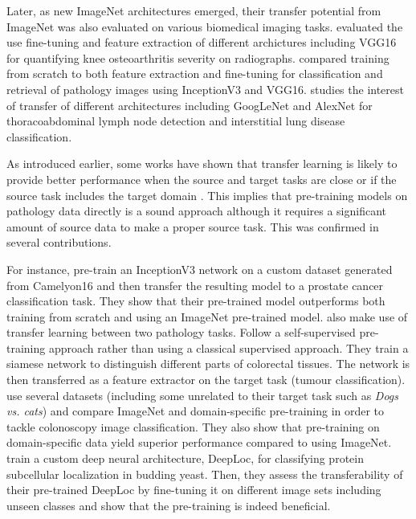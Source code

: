 Later, as new ImageNet architectures emerged, their transfer potential from ImageNet was also evaluated on various biomedical imaging tasks. \parencite{antony2016quantifying} evaluated the use fine-tuning and feature extraction of different archictures including VGG16 for quantifying knee osteoarthritis severity on radiographs. \parencite{kieffer2017convolutional} compared training from scratch to both feature extraction and fine-tuning for classification and retrieval of pathology images using InceptionV3 and VGG16. \parencite{shin2016deep} studies the interest of transfer of different architectures including GoogLeNet and AlexNet for thoracoabdominal lymph node detection and interstitial lung disease classification. 

As introduced earlier, some works have shown that transfer learning is likely to provide better performance when the source and target tasks are close \parencite{yosinski2014transferable} or if the source task includes the target domain \parencite{mensink2021factors}. This implies that pre-training models on pathology data directly is a sound approach although it requires a significant amount of source data to make a proper source task. This was confirmed in several contributions.

For instance, \parencite{khan2019improving} pre-train an InceptionV3 network on a custom dataset generated from Camelyon16 and then transfer the resulting model to a prostate cancer classification task. They show that their pre-trained model outperforms both training from scratch and using an ImageNet pre-trained model. \parencite{medela2019few} also make use of transfer learning between two pathology tasks. Follow a self-supervised pre-training approach rather than using a classical supervised approach. They train a siamese network to distinguish different parts of colorectal tissues. The network is then transferred as a feature extractor on the target task (tumour classification). \parencite{shang2019and} use several datasets (including some unrelated to their target task such as \textit{Dogs vs. cats}) and compare ImageNet and domain-specific pre-training in order to tackle colonoscopy image classification. They also show that pre-training on domain-specific data yield superior performance compared to using ImageNet. \parencite{kraus2017automated} train a custom deep neural architecture, DeepLoc, for classifying protein subcellular localization in budding yeast. Then, they assess the transferability of their pre-trained DeepLoc by fine-tuning it on different image sets including unseen classes and show that the pre-training is indeed beneficial.

